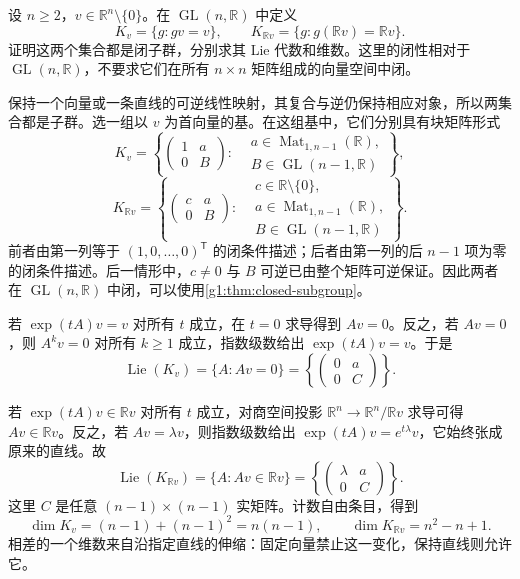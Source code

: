 \begin{exercise}\label{g1:ex:vector-line-stabilizer-subgroups}
	设 \(n\ge2\)，\(v\in\mathbb R^n\setminus\{0\}\)。在 \(\operatorname{GL}(n,\mathbb R)\) 中定义
	\[
		K_v=\{g:gv=v\},\qquad
		K_{\mathbb Rv}=\{g:g(\mathbb Rv)=\mathbb Rv\}.
	\]
	证明这两个集合都是闭子群，分别求其 Lie 代数和维数。这里的闭性相对于 \(\operatorname{GL}(n,\mathbb R)\)，不要求它们在所有 \(n\times n\) 矩阵组成的向量空间中闭。
\end{exercise}
\begin{solution}
	保持一个向量或一条直线的可逆线性映射，其复合与逆仍保持相应对象，所以两集合都是子群。选一组以 \(v\) 为首向量的基。在这组基中，它们分别具有块矩阵形式
	\[
		K_v=
		\left\{
		\begin{pmatrix}
			1&a\\
			0&B
		\end{pmatrix}:
		\begin{aligned}
			&a\in\operatorname{Mat}_{1,n-1}(\mathbb R),\\
			&B\in\operatorname{GL}(n-1,\mathbb R)
		\end{aligned}
		\right\},
	\]
	\[
		K_{\mathbb Rv}=
		\left\{
		\begin{pmatrix}
			c&a\\
			0&B
		\end{pmatrix}:
		\begin{aligned}
			&c\in\mathbb R\setminus\{0\},\\
			&a\in\operatorname{Mat}_{1,n-1}(\mathbb R),\\
			&B\in\operatorname{GL}(n-1,\mathbb R)
		\end{aligned}
		\right\}.
	\]
	前者由第一列等于 \((1,0,\ldots,0)^{\mathsf T}\) 的闭条件描述；后者由第一列的后 \(n-1\) 项为零的闭条件描述。后一情形中，\(c\ne0\) 与 \(B\) 可逆已由整个矩阵可逆保证。因此两者在 \(\operatorname{GL}(n,\mathbb R)\) 中闭，可以使用\cref{g1:thm:closed-subgroup}。

	若 \(\exp(tA)v=v\) 对所有 \(t\) 成立，在 \(t=0\) 求导得到 \(Av=0\)。反之，若 \(Av=0\)，则 \(A^kv=0\) 对所有 \(k\ge1\) 成立，指数级数给出 \(\exp(tA)v=v\)。于是
	\[
		\operatorname{Lie}(K_v)=\{A:Av=0\}
		=
		\left\{
		\begin{pmatrix}
			0&a\\
			0&C
		\end{pmatrix}
		\right\}.
	\]

	若 \(\exp(tA)v\in\mathbb Rv\) 对所有 \(t\) 成立，对商空间投影 \(\mathbb R^n\to\mathbb R^n/\mathbb Rv\) 求导可得 \(Av\in\mathbb Rv\)。反之，若 \(Av=\lambda v\)，则指数级数给出 \(\exp(tA)v=e^{t\lambda}v\)，它始终张成原来的直线。故
	\[
		\operatorname{Lie}(K_{\mathbb Rv})=\{A:Av\in\mathbb Rv\}
		=
		\left\{
		\begin{pmatrix}
			\lambda&a\\
			0&C
		\end{pmatrix}
		\right\}.
	\]
	这里 \(C\) 是任意 \((n-1)\times(n-1)\) 实矩阵。计数自由条目，得到
	\[
		\dim K_v=(n-1)+(n-1)^2=n(n-1),\qquad
		\dim K_{\mathbb Rv}=n^2-n+1.
	\]
	相差的一个维数来自沿指定直线的伸缩：固定向量禁止这一变化，保持直线则允许它。
\end{solution}

